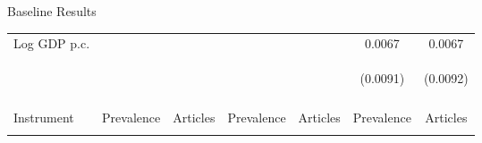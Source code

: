 \documentclass[11pt]{beamer}
\begin{document}
\begin{frame}{Baseline Results}
\begin{table}[htbp]
{\begin{tabular}{lcccccc}
Log GDP p.c. &  &  & &  & 0.0067 & 0.0067 \\
 & \begin{footnotesize} \end{footnotesize} & \begin{footnotesize} \end{footnotesize} & \begin{footnotesize} \end{footnotesize} & \begin{footnotesize} \end{footnotesize} & \begin{footnotesize}(0.0091)\end{footnotesize} & \begin{footnotesize}(0.0092)\end{footnotesize} \\
\vspace{4pt} & \begin{footnotesize}\end{footnotesize} & \begin{footnotesize}\end{footnotesize} & \begin{footnotesize}\end{footnotesize} & \begin{footnotesize}\end{footnotesize} & \begin{footnotesize}\end{footnotesize} & \begin{footnotesize}\end{footnotesize} \\
Instrument & Prevalence & Articles & Prevalence & Articles & Prevalence & Articles \\
\vspace{4pt} & \begin{footnotesize}\end{footnotesize} & \begin{footnotesize}\end{footnotesize} & \begin{footnotesize}\end{footnotesize} & \begin{footnotesize}\end{footnotesize} & \begin{footnotesize}\end{footnotesize} & \begin{footnotesize}\end{footnotesize} \\

\end{tabular}}
\end{table}
\end{frame}
\end{document}
